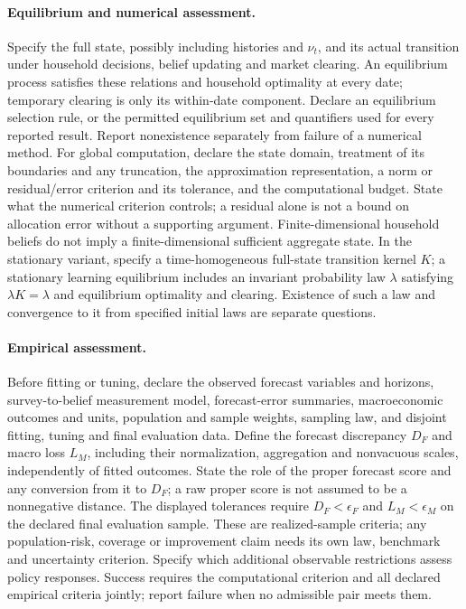 \documentclass[11pt,a4paper]{article}
\begin{document}
\paragraph{Equilibrium and numerical assessment.} Specify the full state, possibly including histories and \(\nu_t\), and its actual transition under household decisions, belief updating and market clearing. An equilibrium process satisfies these relations and household optimality at every date; temporary clearing is only its within-date component. Declare an equilibrium selection rule, or the permitted equilibrium set and quantifiers used for every reported result. Report nonexistence separately from failure of a numerical method. For global computation, declare the state domain, treatment of its boundaries and any truncation, the approximation representation, a norm or residual/error criterion and its tolerance, and the computational budget. State what the numerical criterion controls; a residual alone is not a bound on allocation error without a supporting argument. Finite-dimensional household beliefs do not imply a finite-dimensional sufficient aggregate state. In the stationary variant, specify a time-homogeneous full-state transition kernel \(K\); a stationary learning equilibrium includes an invariant probability law \(\lambda\) satisfying \(\lambda K=\lambda\) and equilibrium optimality and clearing. Existence of such a law and convergence to it from specified initial laws are separate questions.

\paragraph{Empirical assessment.} Before fitting or tuning, declare the observed forecast variables and horizons, survey-to-belief measurement model, forecast-error summaries, macroeconomic outcomes and units, population and sample weights, sampling law, and disjoint fitting, tuning and final evaluation data. Define the forecast discrepancy \(D_F\) and macro loss \(L_M\), including their normalization, aggregation and nonvacuous scales, independently of fitted outcomes. State the role of the proper forecast score and any conversion from it to \(D_F\); a raw proper score is not assumed to be a nonnegative distance. The displayed tolerances require \(D_F<\epsilon_F\) and \(L_M<\epsilon_M\) on the declared final evaluation sample. These are realized-sample criteria; any population-risk, coverage or improvement claim needs its own law, benchmark and uncertainty criterion. Specify which additional observable restrictions assess policy responses. Success requires the computational criterion and all declared empirical criteria jointly; report failure when no admissible pair meets them.
\end{document}
